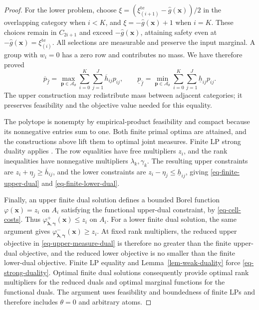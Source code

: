 \documentclass[review,11pt,3p,authoryear,nopreprintline]{elsarticle}
\begin{document}
\begin{proof}
  For the lower problem, choose
  $\xi=\left(\xi_{(i+1)}^{\mathrm{te}}-\hat g(\bm x)\right)/2$ in the overlapping category when $i<K$, and $\xi=-\hat g(\bm x)+1$ when $i=K$. These choices remain in $C_{2i+1}$ and exceed $-\hat g(\bm x)$, attaining safety even at $-\hat g(\bm x)=\xi_{(i)}^{\mathrm{te}}$. All selections are measurable and preserve the input marginal. A group with $w_i=0$ has a zero row and contributes no mass. We have therefore proved
  \begin{equation}
    \overline p_{\hat f}
    =\max_{\bm p\in\mathcal A_\theta}\sum_{i=0}^K\sum_{j=1}^J
      \overline h_{ij}p_{ij},\qquad
    \underline p_{\hat f}
    =\min_{\bm p\in\mathcal A_\theta}\sum_{i=0}^K\sum_{j=1}^J
      \underline h_{ij}p_{ij}.
    \label{eq-finite-primal-values}
  \end{equation}
  The upper construction may redistribute mass between adjacent categories; it preserves feasibility and the objective value needed for this equality.

  The polytope is nonempty by empirical-product feasibility and compact because its nonnegative entries sum to one. Both finite primal optima are attained, and the constructions above lift them to optimal joint measures. Finite LP strong duality applies \citep[Section~5.2.3]{B.V04}. The row equalities have free multipliers $z_i$, and the rank inequalities have nonnegative multipliers $\lambda_k,\gamma_k$. The resulting upper constraints are $z_i+\eta_j\ge\overline h_{ij}$, and the lower constraints are $z_i-\eta_j\le\underline h_{ij}$, giving \eqref{eq-finite-upper-dual} and \eqref{eq-finite-lower-dual}.

  Finally, an upper finite dual solution defines a bounded Borel function $\varphi(\bm x)=z_i$ on $A_i$ satisfying the functional upper-dual constraint, by \eqref{eq-cell-costs}. Thus $\varphi^+_{\bm\lambda,\bm\gamma}(\bm x)\le z_i$ on $A_i$. For a lower finite dual solution, the same argument gives $\varphi^-_{\bm\lambda,\bm\gamma}(\bm x)\ge z_i$. At fixed rank multipliers, the reduced upper objective in \eqref{eq-upper-measure-dual} is therefore no greater than the finite upper-dual objective, and the reduced lower objective is no smaller than the finite lower-dual objective. Finite LP equality and Lemma~\ref{lem-weak-duality} force \eqref{eq-strong-duality}. Optimal finite dual solutions consequently provide optimal rank multipliers for the reduced duals and optimal marginal functions for the functional duals. The argument uses feasibility and boundedness of finite LPs and therefore includes $\theta=0$ and arbitrary atoms.
\end{proof}
\end{document}
